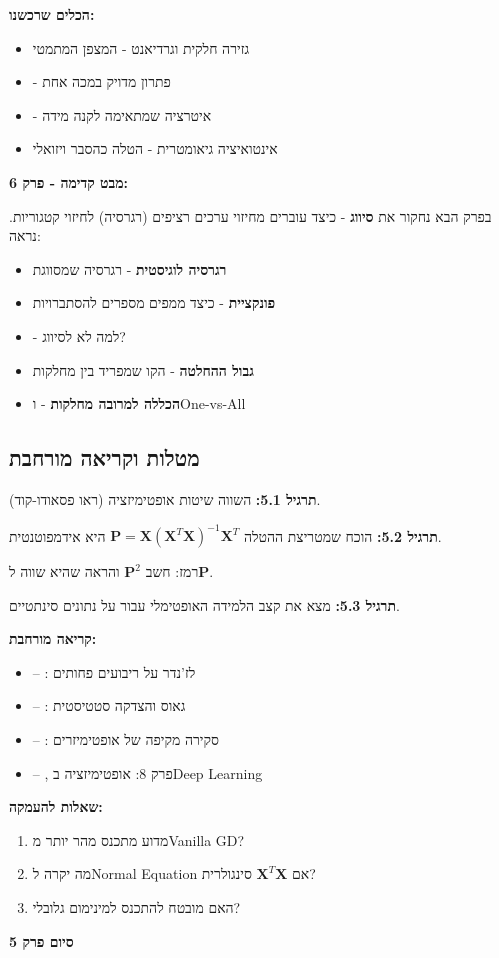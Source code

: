 \textbf{הכלים שרכשנו:}

\begin{itemize}
\item גזירה חלקית וגרדיאנט - המצפן המתמטי
\item {} - פתרון מדויק במכה אחת
\item {} - איטרציה שמתאימה לקנה מידה
\item אינטואיציה גיאומטרית - הטלה כהסבר ויזואלי
\end{itemize}

\textbf{מבט קדימה - פרק \num{6}:}

בפרק הבא נחקור את \textbf{סיווג} - כיצד עוברים מחיזוי ערכים רציפים (רגרסיה) לחיזוי קטגוריות. נראה:

\begin{itemize}
\item \textbf{רגרסיה לוגיסטית} - רגרסיה שמסווגת
\item \textbf{פונקציית } - כיצד ממפים מספרים להסתברויות
\item \textbf{} - למה לא  לסיווג?
\item \textbf{גבול ההחלטה} - הקו שמפריד בין מחלקות
\item \textbf{הכללה למרובה מחלקות} -  ו\en{-}One-vs-All
\end{itemize}

\subsection*{מטלות וקריאה מורחבת}

\textbf{תרגיל \num{5.1}:} השווה שיטות אופטימיזציה (ראו פסאודו-קוד).

\textbf{תרגיל \num{5.2}:} הוכח שמטריצת ההטלה $\mathbf{P} = \mathbf{X}(\mathbf{X}^T\mathbf{X})^{-1}\mathbf{X}^T$ היא אידמפוטנטית.

רמז: חשב $\mathbf{P}^2$ והראה שהיא שווה ל\en{-}$\mathbf{P}$.

\textbf{תרגיל \num{5.3}:} מצא את קצב הלמידה האופטימלי עבור  על נתונים סינתטיים.

\textbf{קריאה מורחבת:}

\begin{itemize}
\item \cite{legendre1805} – : לז'נדר על ריבועים פחותים
\item \cite{gauss1809} – : גאוס והצדקה סטטיסטית
\item \cite{ruder2016} – : סקירה מקיפה של אופטימיזרים
\item \cite{goodfellow2016} – , פרק \num{8}: אופטימיזציה ב\en{-}Deep Learning
\end{itemize}

\textbf{שאלות להעמקה:}

\begin{enumerate}
\item מדוע  מתכנס מהר יותר מ\en{-}Vanilla GD?
\item מה יקרה ל\en{-}Normal Equation אם $\mathbf{X}^T\mathbf{X}$ סינגולרית?
\item האם  מובטח להתכנס למינימום גלובלי?
\end{enumerate}

\textbf{סיום פרק \num{5}}